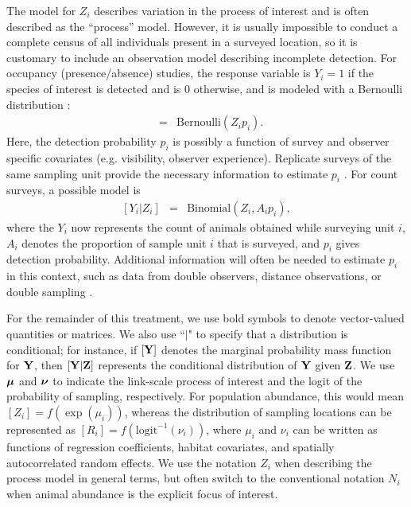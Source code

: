 \documentclass[times,mee,doublespace,]{besauth2}
\begin{document}
The model for $Z_i$ describes variation in the process of interest and is often described as the ``process'' model.  However, it is usually impossible to conduct a complete census of all individuals present in a surveyed location, so it is customary to include an observation model describing incomplete detection.  For occupancy (presence/absence) studies, the response variable is $Y_i = 1$ if the species of interest is detected and is 0 otherwise, and is modeled with a Bernoulli distribution \citep{Royle2008}:
\begin{eqnarray}
  [Y_i|Z_i] & = & \text{Bernoulli}(Z_i p_i).
\end{eqnarray}
 Here, the detection probability $p_i$ is possibly a function of survey and observer specific covariates (e.g. visibility, observer experience). Replicate surveys of the same sampling unit provide the necessary information to estimate $p_i$ \citep{MacKenzie2002}.   For count surveys, a possible model is
\begin{eqnarray}
  \label{eq:obs_binomial}
  [Y_i|Z_i] & = & \text{Binomial}(Z_i, A_i p_i),
\end{eqnarray}
where the $Y_i$ now represents the count of animals obtained while surveying unit $i$, $A_i$ denotes the proportion of sample unit $i$ that is surveyed, and $p_i$ gives detection probability.  Additional information will often be needed to estimate $p_i$ in this context, such as data from double observers, distance observations, or double sampling \citep[see e.g.][]{BucklandEtAl2001,Royle2004,Borchers2006,ConnEtAl2014}.

For the remainder of this treatment, we use bold symbols to denote vector-valued quantities or matrices.  We also use ``$|$" to specify that a distribution is conditional; for instance, if $[{\bf Y}]$ denotes the marginal probability mass function for ${\bf Y}$, then  $[{\bf Y}|{\bf Z}]$ represents the conditional distribution of ${\bf Y}$ given ${\bf Z}$.  We use $\boldsymbol{\mu}$ and $\boldsymbol{\nu}$ to indicate the link-scale process of interest and the logit of the probability of sampling, respectively.  For population abundance, this would mean $[Z_i] = f(\exp(\mu_i))$, whereas the distribution of sampling locations can be represented as $[R_i] = f(\text{logit}^{-1}(\nu_i))$, where $\mu_i$ and $\nu_i$ can be written as functions of regression coefficients, habitat covariates, and spatially autocorrelated random effects.  We use the notation $Z_i$ when describing the process model in general terms, but often switch to the conventional notation $N_i$ when animal abundance is the explicit focus of interest.
\end{document}
